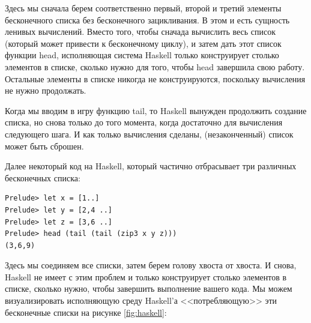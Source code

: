 Здесь мы сначала берем соответственно первый, второй и третий элементы бесконечного 
списка без бесконечного зацикливания. В этом  и есть сущность ленивых вычислений. 
Вместо того, чтобы сначада вычислить весь список (который может привести к 
бесконечному циклу), и затем дать этот список функции head, исполняющая система Haskell 
только конструирует столько элементов в списке, сколько нужно для того, чтобы 
head завершила свою работу. Остальные элементы в списке никогда не конструируются, 
поскольку вычисления не нужно продолжать.   


Когда мы вводим в игру функцию tail, то Haskell вынужден 
продолжить создание списка, но снова только до того момента, когда 
достаточно для вычисления следующего шага. И как только вычисления 
сделаны, (незаконченный) список может быть сброшен.  


Далее некоторый код на Haskell, который частично отбрасывает три 
различных бесконечных списка: 

\begin{scriptsize}\begin{verbatim}
Prelude> let x = [1..]
Prelude> let y = [2,4 ..]
Prelude> let z = [3,6 ..]
Prelude> head (tail (tail (zip3 x y z)))
(3,6,9)
\end{verbatim}\end{scriptsize}


Здесь мы соединяем все списки, затем берем голову хвоста от хвоста. 
И снова, Haskell не имеет с этим проблем и только конструирует 
столько элементов в списке, сколько нужно, чтобы 
завершить выполнение вашего кода. Мы можем визуализировать 
исполняющую среду Haskell'а <<потребляющую>> эти бесконечные списки на рисунке \ref{fig:haskell}:  

